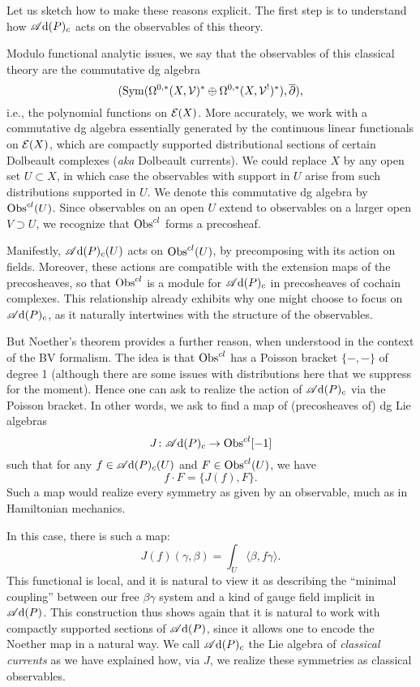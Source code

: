\subsubsection{}

Let us sketch how to make these reasons explicit.
The first step is to understand how $\mathscr A{\rm d}(P)_c$ acts on the observables of this theory.

Modulo functional analytic issues,
we say that the observables of this classical theory are the commutative dg algebra
\[
({\rm Sym}(\Omega^{0,*}(X,\mathcal{V})^* \oplus \Omega^{0,*}(X, \mathcal{V}^!)^*), \overline{\partial}),
\]
i.e., the polynomial functions on $\mathcal E(X)$.
More accurately, we work with a commutative dg algebra essentially generated by the continuous linear functionals on $\mathcal E(X)$, 
which are compactly supported distributional sections of certain Dolbeault complexes ({\it aka} Dolbeault currents).
We could replace $X$ by any open set $U \subset X$, 
in which case the observables with support in $U$ arise from such distributions supported in $U$.
We denote this commutative dg algebra by ${\rm Obs}^{cl}(U)$.
Since observables on an open $U$ extend to observables on a larger open $V \supset U$,
we recognize that ${\rm Obs}^{cl}$ forms a precosheaf.

Manifestly, $\mathscr A{\rm d}(P)_c(U)$ acts on ${\rm Obs}^{cl}(U)$,
by precomposing with its action on fields.
Moreover, these actions are compatible with the extension maps of the precosheaves,
so that ${\rm Obs}^{cl}$ is a module for $\mathscr A{\rm d}(P)_c$ in precosheaves of cochain complexes.
This relationship already exhibits why one might choose to focus on $\mathscr A{\rm d}(P)_c$,
as it naturally intertwines with the structure of the observables.

But Noether's theorem provides a further reason,
when understood in the context of the BV formalism.
The idea is that ${\rm Obs}^{cl}$ has a Poisson bracket $\{-,-\}$ of degree 1
(although there are some issues with distributions here that we suppress for the moment).
Hence one can ask to realize the action of $\mathscr A{\rm d}(P)_c$ via the Poisson bracket.
In other words, we ask to find a map of (precosheaves of) dg Lie algebras
\[
J \colon \mathscr A{\rm d}(P)_c \to {\rm Obs}^{cl}[-1]
\]
such that for any $f \in \mathscr A{\rm d}(P)_c(U)$ and $F \in {\rm Obs}^{cl}(U)$,
we have
\[
f \cdot F = \{J(f),F\}.
\]
Such a map would realize every symmetry as given by an observable,
much as in Hamiltonian mechanics.

In this case, there is such a map:
\[
J(f)(\gamma,\beta) = \int_U \langle\beta, f \gamma\rangle.
\]
This functional is local, and it is natural to view it as describing the ``minimal coupling'' between our free $\beta\gamma$ system and a kind of gauge field implicit in $\mathscr A{\rm d}(P)$.
This construction thus shows again that it is natural to work with compactly supported sections of $\mathscr A{\rm d}(P)$,
since it allows one to encode the Noether map in a natural way.
We call $\mathscr A{\rm d}(P)_c$ the Lie algebra of {\em classical currents} as we have explained how, via $J$, we realize these symmetries as classical observables.

